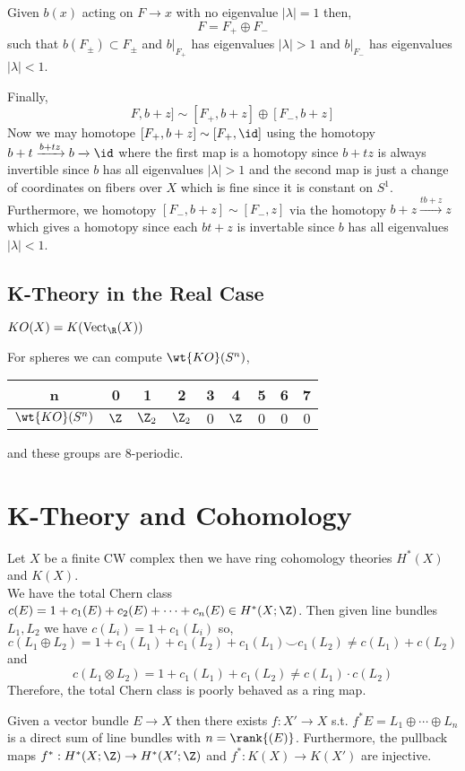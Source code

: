 \documentclass[12pt]{extarticle}
\begin{document}
\begin{lemma}
Given $b(x)$ acting on $F \to x$ with no eigenvalue $|\lambda| = 1$ then,
\[ F = F_{+} \oplus F_{-} \]
such that $b(F_{\pm}) \subset F_{\pm}$ and $b|_{F_{+}}$ has eigenvalues $|\lambda| > 1$ and $b|_{F_{-}}$ has eigenvalues $|\lambda| < 1$. 
\end{lemma}
\noindent
Finally, 
\[ F, b + z] \sim [F_+, b + z] \oplus [F_{-}, b + z] \]
Now we may homotope $[F_+, b + z] \sim [F_+, \id]$ using the homotopy $b + t \xrightarrow{b + t z} b \xrightarrow{} \id$ where the first map is a homotopy since $b + t z$ is always invertible since $b$ has all eigenvalues $|\lambda| > 1$ and the second map is just a change of coordinates on fibers over $X$ which is fine since it is constant on $S^1$. Furthermore, we homotopy $[F_{-}, b + z] \sim [F_{-}, z]$ via the homotopy $b+z \xrightarrow{t b + z} z$ which gives a homotopy since each $b t + z$ is invertable since $b$ has all eigenvalues $|\lambda| < 1$.

\subsection{K-Theory in the Real Case}

\begin{defn}
$KO(X) = K(\Vect_\R(X))$
\end{defn}

\begin{example}
For spheres we can compute $\wt{KO}(S^n)$,
\begin{center}
\begin{tabular}{ c | c | c | c | c | c | c | c | c }
n & 0 & 1 & 2 & 3 & 4 & 5 & 6 & 7 \\
\hline \hline
$\wt{KO}(S^n)$ & $\Z$  & $\Z_2$ & $\Z_2$ & $0$ & $\Z$ & $0$ & $0$ & $0$
\end{tabular}
\end{center}
and these groups are $8$-periodic.
\end{example}

\section{K-Theory and Cohomology}

Let $X$ be a finite CW complex then we have ring cohomology theories $H^*(X)$ and $K(X)$. 
\bigskip\\
We have the total Chern class $c(E) = 1 + c_1(E) + c_2(E) + \cdots + c_n(E) \in H^*(X; \Z)$. 
Then given line bundles $L_1, L_2$ we have $c(L_i) = 1 + c_1(L_i)$ so,
\[ c(L_1 \oplus L_2) = 1 + c_1(L_1) + c_1(L_2)+ c_1(L_1) \smile c_1(L_2) \neq c(L_1) + c(L_2) \]
and
\[ c(L_1 \otimes L_2) = 1 + c_1(L_1) + c_1(L_2) \neq c(L_1) \cdot c(L_2) \]
Therefore, the total Chern class is poorly behaved as a ring map. 
\bigskip\\
\begin{theorem}[Splitting]
Given a vector bundle $E \to X$ then there exists $f : X' \to X$ s.t. $f^* E = L_1 \oplus \cdots \oplus L_n$ is a direct sum of line bundles with $n = \rank{(E)}$. Furthermore, the pullback maps  $f^* : H^*(X; \Z) \to H^*(X'; \Z)$ and $f^* : K(X) \to K(X')$ are injective. 
\end{theorem}
\end{document}
